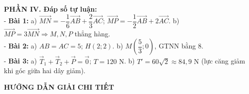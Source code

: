 \documentclass[10pt,a4paper]{article}
\begin{document}
\vspace{5pt}
\noindent\textbf{PHẦN IV. Đáp số tự luận:}\\[2pt]
- \textbf{Bài 1:} a) $\vec{MN} = -\dfrac{1}{6}\vec{AB} + \dfrac{2}{3}\vec{AC}$; $\vec{MP} = -\dfrac{1}{2}\vec{AB} + 2\vec{AC}$. b) $\vec{MP} = 3\vec{MN} \Rightarrow M, N, P$ thẳng hàng.\\
- \textbf{Bài 2:} a) $AB = AC = 5$; $H(2; 2)$. b) $M\left(\dfrac{5}{3}; 0\right)$, GTNN bằng $8$.\\
- \textbf{Bài 3:} a) $\vec{T}_1 + \vec{T}_2 + \vec{P} = \vec{0}$; $T = 120\text{ N}$. b) $T' = 60\sqrt{2} \approx 84{,}9\text{ N}$ (lực căng giảm khi góc giữa hai dây giảm).

\vspace{4pt}
\begin{center}
  {\large\bfseries\color{ink} HƯỚNG DẪN GIẢI CHI TIẾT}
\end{center}
\vspace{1pt}
\end{document}
